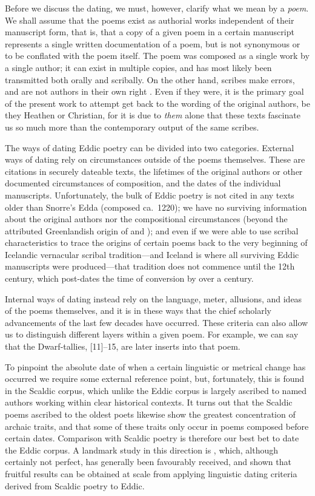 Before we discuss the dating, we must, however, clarify what we mean by a \emph{poem}.  We shall assume that the poems exist as authorial works independent of their manuscript form, that is, that a copy of a given poem in a certain manuscript represents a single written documentation of a poem, but is not synonymous or to be conflated with the poem itself.  The poem was composed as a single work by a single author; it can exist in multiple copies, and has most likely been transmitted both orally and scribally.  On the other hand, scribes make errors, and are not authors in their own right \parencites{Males2023Textual}{Males2024Emend}{Haukur2020}.  Even if they were, it is the primary goal of the present work to attempt get back to the wording of the original authors, be they Heathen or Christian, for it is due to \emph{them} alone that these texts fascinate us so much more than the contemporary output of the same scribes.

The ways of dating Eddic poetry can be divided into two categories.  External ways of dating rely on circumstances outside of the poems themselves.  These are citations in securely dateable texts, the lifetimes of the original authors or other documented circumstances of composition, and the dates of the individual manuscripts.  Unfortunately, the bulk of Eddic poetry is not cited in any texts older than Snorre’s Edda (composed ca.~1220); we have no surviving information about the original authors nor the compositional circumstances (beyond the attributed Greenlandish origin of  and ); and even if we were able to use scribal characteristics to trace the origins of certain poems back to the very beginning of Icelandic vernacular scribal tradition---and Iceland is where all surviving Eddic manuscripts were produced---that tradition does not commence until the 12th century, which post-dates the time of conversion by over a century.

Internal ways of dating instead rely on the language, meter, allusions, and ideas of the poems themselves, and it is in these ways that the chief scholarly advancements of the last few decades have occurred.  These criteria can also allow us to distinguish different layers within a given poem.  For example, we can say that the Dwarf-tallies, [11]--15, are later inserts into that poem.

To pinpoint the absolute date of when a certain linguistic or metrical change has occurred we require some external reference point, but, fortunately, this is found in the Scaldic corpus, which unlike the Eddic corpus is largely ascribed to named authors working within clear historical contexts.  It turns out that the Scaldic poems ascribed to the oldest poets likewise show the greatest concentration of archaic traits, and that some of these traits only occur in poems composed before certain dates.  Comparison with Scaldic poetry is therefore our best bet to date the Eddic corpus.
A landmark study in this direction is \textcite{Sapp2022}, which, although certainly not perfect, has generally been favourably received, and shown that fruitful results can be obtained at scale from applying linguistic dating criteria derived from Scaldic poetry to Eddic.


